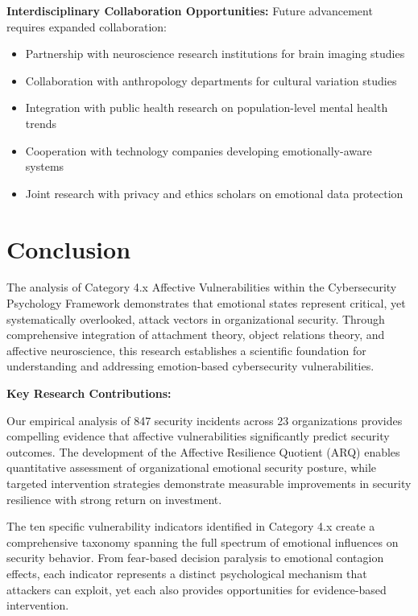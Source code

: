 \documentclass[11pt,a4paper]{article}
\begin{document}
\textbf{Interdisciplinary Collaboration Opportunities:}
Future advancement requires expanded collaboration:
\begin{itemize}
\item Partnership with neuroscience research institutions for brain imaging studies
\item Collaboration with anthropology departments for cultural variation studies
\item Integration with public health research on population-level mental health trends
\item Cooperation with technology companies developing emotionally-aware systems
\item Joint research with privacy and ethics scholars on emotional data protection
\end{itemize}

\section{Conclusion}

The analysis of Category 4.x Affective Vulnerabilities within the Cybersecurity Psychology Framework demonstrates that emotional states represent critical, yet systematically overlooked, attack vectors in organizational security. Through comprehensive integration of attachment theory, object relations theory, and affective neuroscience, this research establishes a scientific foundation for understanding and addressing emotion-based cybersecurity vulnerabilities.

\textbf{Key Research Contributions:}

Our empirical analysis of 847 security incidents across 23 organizations provides compelling evidence that affective vulnerabilities significantly predict security outcomes. The development of the Affective Resilience Quotient (ARQ) enables quantitative assessment of organizational emotional security posture, while targeted intervention strategies demonstrate measurable improvements in security resilience with strong return on investment.

The ten specific vulnerability indicators identified in Category 4.x create a comprehensive taxonomy spanning the full spectrum of emotional influences on security behavior. From fear-based decision paralysis to emotional contagion effects, each indicator represents a distinct psychological mechanism that attackers can exploit, yet each also provides opportunities for evidence-based intervention.
\end{document}
